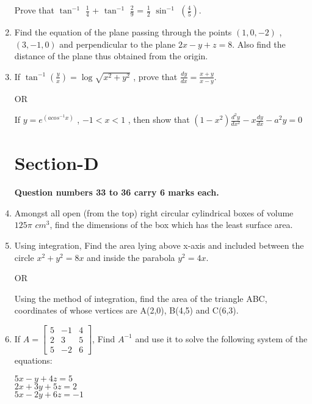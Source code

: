 \documentclass[journal,12pt,twocolumn]{IEEEtran}
\renewcommand\thesection{\arabic{section}}
\begin{document}
\begin{enumerate}[label=\thesection.\arabic*.,ref=\thesection.\theenumi]
    Prove that $\tan^{-1}$ $\frac{1}{4}$ + $\tan^{-1}$ $\frac{2}{9}$ = $\frac{1}{2}$ $\sin^{-1}$ $(\frac{4}{5})$.\\

\item Find the equation of the plane passing through the points $(1,0,-2)$ , $(3,-1,0)$ and perpendicular to the plane $ 2x-y+z=8 $. Also find the distance of the plane thus obtained from the origin.\\

\item If $\tan^{-1}(\frac{y}{x})=\log \sqrt{x^2+y^2}$ , prove that $\frac{dy}{dx}=\frac{x+y}{x-y}$.  

\begin{center}
        OR
    \end{center}
    
   If  $ y=e^{(acos^{-1}x)} $ , $-1 < x < 1$ , then show that  $(1-x^2) \frac{d^2y}{dx^2} - x \frac{dy}{dx} - a^2y =0 $\\

 \section{Section-D}
 
 \textbf{Question numbers 33 to 36 carry 6 marks each.}\\
 
 \item Amongst all open (from the top) right circular cylindrical boxes of volume $125 \pi $ $cm^3$, find the dimensions of the box which has the least surface area.\\  
 
\item Using integration, Find the area lying above x-axis and included between the circle $ x^2 + y^2 =8x $ and inside the parabola $ y^2 =4x $.   

\begin{center}
        OR
    \end{center}
    
  Using the method of integration, find the area of the triangle ABC, coordinates of whose vertices are A(2,0), B(4,5) and C(6,3).\\

\item If $A=\begin{bmatrix}5 & -1 & 4 \\ 2 & 3 & 5 \\ 5 & -2 & 6 \end{bmatrix} $, Find $A^{-1}$ and use it to solve the following system of the equations: \\
\begin{center}
        $5x-y+4z=5 $\\
        $2x+3y+5z=2 $\\
        $5x-2y+6z=-1 $
    \end{center}
    

\end{enumerate}
\end{document}
